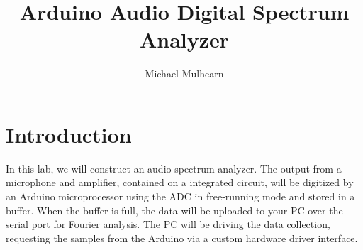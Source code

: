 \documentclass[12pt]{article}
\begin{document}
\title{Arduino Audio Digital Spectrum Analyzer}
\author{Michael Mulhearn}

\maketitle

\section{Introduction}

In this lab, we will construct an audio spectrum analyzer.  The output from a microphone and amplifier, contained on a integrated circuit, will be digitized by an Arduino microprocessor using the ADC in free-running mode and stored in a buffer.  When the buffer is full, the data will be uploaded to your PC over the serial port for Fourier analysis.  The PC will be driving the data collection, requesting the samples from the Arduino via a custom hardware driver interface.
\end{document}
